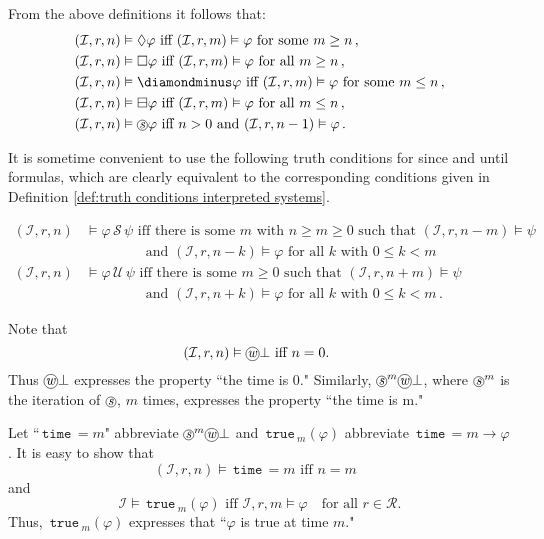 \documentclass[envcountsect,envcountsame,oribibl,orivec]{llncs}
\newcommand*\circled[1]{\tikz[baseline=(char.base)]{
		\node[shape=circle,draw,inner sep=0.4pt] (char) {#1};}}
\newcommand{\lalways}{\Box}
\newcommand{\leventually}{\Diamond}
\newcommand{\lonce}{\diamondminus}
\newcommand{\lsofar}{\boxminus}
\newcommand{\luntil}{{\,\mathcal{U}\,}}
\newcommand{\lsince}{{\,\mathcal{S}\,}}
\newcommand{\ltime}{{\,\texttt{time}\,}}
\newcommand{\ltrue}{{\,\texttt{true}\,}}
\newcommand{\wprevious}{\circled{\textit{w}}}
\newcommand{\sprevious}{\circled{\textit{s}}}
\newcommand{\system}{\mathcal{I}}
\newcommand{\entails}{\vDash}
\renewcommand{\phi}{\varphi}
\begin{document}
 
From the above definitions it follows that:  
	\begin{align*}
	(\system, r, n) &\entails \leventually \phi \text{ iff } (\system, r, m) \entails \phi \text{ for some } m\geq n \, ,\\
	(\system, r, n) &\entails \lalways \phi \text{ iff } (\system, r, m) \entails \phi \text{ for all } m\geq n \, ,\\
	(\system, r, n) &\entails \lonce \phi \text{ iff } (\system, r, m) \entails \phi \text{ for some } m \leq n \, ,\\
	(\system, r, n) &\entails \lsofar \phi \text{ iff } (\system, r, m) \entails \phi \text{ for all } m \leq n \, ,\\
	(\system, r, n) &\entails \sprevious \phi \text{ iff $n>0$ and } (\system, r, n-1) \entails \phi \, .
	\end{align*}
 
It is sometime convenient to use the following truth conditions for since and until formulas, which are clearly equivalent to the corresponding conditions given in Definition \ref{def:truth conditions interpreted systems}.
 
 \begin{align*}
 (\system, r, n) &\entails \phi \lsince \psi \text{ iff there is some $m$ with } n \geq m \geq 0 \text{ such that } (\system, r, n-m) \entails \psi \\ & \qquad\qquad \text{ and } (\system, r, n-k) \entails \phi \text{ for all $k$ with } 0 \leq k < m \, \\
(\system, r, n) &\entails \phi \luntil \psi \text{ iff there is some } m \geq 0 \text{ such that } (\system, r, n+m) \entails \psi \\ & \qquad\qquad \text{ and } (\system, r, n+k) \entails \phi \text{ for all $k$ with } 0 \leq k < m \, .
\end{align*}

\begin{remark}\label{rem:time is n-interpreted systems}
	Note that 
	\[
	(\system, r, n) \entails \wprevious \bot \text{ iff $n=0$. }
	\]
	Thus $\wprevious \bot$ expresses the property ``the time is 0." Similarly, $\sprevious^m \wprevious\bot$, where $\sprevious^m$ is the iteration of $\sprevious$, $m$ times, expresses the property ``the time is m." 
	
	Let ``$\ltime=m$" abbreviate $\sprevious^m \wprevious \bot$ and $\ltrue_m (\phi)$ abbreviate $\ltime = m \to \phi$. It is easy to show that
	\[
	(\system, r, n) \entails \ltime=m  \text{ iff $n=m$ }
	\]
	and
	\[
	\system \models \ltrue_m (\phi) \text{ iff } \system, r, m \models \phi \quad \text{for all $r \in \mathcal{R}$}.
	\]
	Thus, $\ltrue_m (\phi)$ expresses that ``$\phi$ is true at time $m$."
\end{remark}
\end{document}
